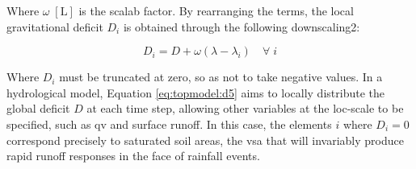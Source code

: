 \documentclass[./main_en.tex]{subfiles}
\begin{document}
Where $\omega \; [\text{L}]$ is the \gls{scalab} factor. By rearranging the terms, the local gravitational deficit $D_{i}$ is obtained through the following \gls{downscaling2}:
\begin{linenomath*}
\begin{equation}
\label{eq:topmodel:d5}
D_{i}  = D + \omega (\lambda - \lambda_{i}) \quad \forall \; i
\end{equation}
\end{linenomath*}
Where $D_i$ must be truncated at zero, so as not to take negative values. In a hydrological \gls{model}, Equation \eqref{eq:topmodel:d5} aims to locally distribute the global deficit $D$ at each time step, allowing other variables at the \gls{loc-scale} to be specified, such as \gls{qv} and surface runoff. In this case, the elements $i$ where $D_i = 0$ correspond precisely to saturated soil areas, the \gls{vsa} that will invariably produce rapid runoff responses in the face of rainfall events.
\end{document}
